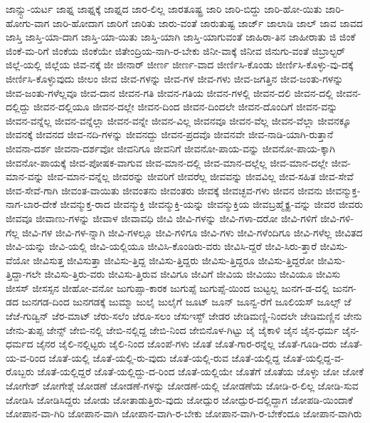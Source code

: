 {ಜಾನ್ಸ್ಟು-ಯರ್ಟ
ಜಾಫ್ನ
ಜಾಫ್ನಕ್ಕೆ
ಜಾಫ್ನದ
ಜಾರ-ಲಿಲ್ಲ
ಜಾರತೂಷ್ಟ್ರ
ಜಾರಿ
ಜಾರಿ-ಬಿದ್ದು
ಜಾರಿ-ಹೋ-ಯಿತು
ಜಾರಿ-ಹೋಗು-ವಾಗ
ಜಾರಿ-ಹೋದಾಗ
ಜಾರಿಗೆ
ಜಾರಿತು
ಜಾರು-ವಂತೆ
ಜಾರುತುಷ್ಟ
ಜಾರ್ಜ್
ಜಾಲಾಡಿ
ಜಾಲ್
ಜಾವ
ಜಾವದ
ಜಾಸ್ತಿ
ಜಾಸ್ತಿ-ಯಾ-ದಾಗ
ಜಾಸ್ತಿ-ಯಾ-ಯಿತು
ಜಾಸ್ತಿ-ಯಾಗಿ
ಜಾಸ್ತಿ-ಯಾಗುವಂತೆ
ಜಾಹಿರಾ-ತಿನ
ಜಾಹೀರಾತು
ಜಿ
ಜಿಂಕೆ
ಜಿಂಕೆ-ಮ-ರಿಗೆ
ಜಿಂಕೆಯ
ಜಿಂಕೆಯೇ
ಜಿತೇಂದ್ರಿಯ-ನಾಗಿ-ರ-ಬೇಕು
ಜಿನೀ-ವಾಕ್ಕೆ
ಜಿನೀವ
ಜಿನುಗು-ವಂತೆ
ಜಿಬ್ರಾಲ್ಟರ್
ಜಿಲ್ಲೆ-ಯಲ್ಲಿ
ಜಿಲ್ಲೆಯ
ಜಿವ-ನಕ್ಕೆ
ಜೀ
ಜೀನಾರ್
ಜೀರ್ಣ
ಜೀರ್ಣ-ವಾದ
ಜೀರ್ಣಿಸಿ-ಕೊಂಡು
ಜೀರ್ಣಿಸಿ-ಕೊಳ್ಳು-ವು-ದಕ್ಕೆ
ಜೀರ್ಣಿಸಿ-ಕೊಳ್ಳುವುದು
ಜೀಲಂ
ಜೀವ
ಜೀವ-ಗಳನ್ನು
ಜೀವ-ಗಳ
ಜೀವ-ಗಳು
ಜೀವ-ಜಗತ್ತಿನ
ಜೀವ-ಜಂತು-ಗಳನ್ನು
ಜೀವ-ಜಂತು-ಗಳೆಲ್ಲವೂ
ಜೀವ-ದಾನ
ಜೀವನ-ಗತಿ
ಜೀವನ-ಗತಿಯ
ಜೀವನ-ಗಳಲ್ಲಿ
ಜೀವನ-ದಲಿ
ಜೀವನ-ದಲ್ಲಿ
ಜೀವನ-ದಲ್ಲಿದ್ದು
ಜೀವನ-ದಲ್ಲಿಯೂ
ಜೀವನ-ದಲ್ಲೇ
ಜೀವನ-ದಿಂದ
ಜೀವನ-ದಿಂದಲೇ
ಜೀವನ-ದೊಂದಿಗೆ
ಜೀವನ-ವನ್ನು
ಜೀವನ-ವನ್ನೆಲ್ಲ
ಜೀವನ-ವನ್ನೆಲ್ಲಾ
ಜೀವನ-ವನ್ನೇ
ಜೀವನ-ವಿಲ್ಲ
ಜೀವನವೂ
ಜೀವನ-ವೆಲ್ಲ
ಜೀವನ-ವೆಲ್ಲಾ
ಜೀವನಕ್ಕೂ
ಜೀವನಕ್ಕೆ
ಜೀವನದ
ಜೀವ-ನದಿ-ಗಳನ್ನು
ಜೀವನದ್ದು
ಜೀವನ-ಪ್ರದವೊ
ಜೀವನವೇ
ಜೀವ-ನಾಡಿ-ಯಾಗಿ-ರುತ್ತಾನೆ
ಜೀವನಾ-ದರ್ಶ
ಜೀವನಾ-ದರ್ಶವೋ
ಜೀವನಿಗೂ
ಜೀವನಿಗೆ
ಜೀವನೋ-ಪಾಯ-ವನ್ನು
ಜೀವನೋ-ಪಾಯ-ಕ್ಕಾಗಿ
ಜೀವನೋ-ಪಾಯಕ್ಕೆ
ಜೀವ-ಪೋಷಕ-ವಾಗುವ
ಜೀವ-ಮಾನ-ದಲ್ಲಿ
ಜೀವ-ಮಾನ-ದಲ್ಲೆಲ್ಲ
ಜೀವ-ಮಾನ-ದಲ್ಲೇ
ಜೀವ-ಮಾನ-ವನ್ನು
ಜೀವ-ಮಾನ-ವನ್ನೆಲ್ಲ
ಜೀವರನ್ನು
ಜೀವರಿಗೆ
ಜೀವರೆಲ್ಲ
ಜೀವವನ್ನು
ಜೀವವಿಲ್ಲ
ಜೀವ-ಸಹಿತ
ಜೀವ-ಸೇವೆ
ಜೀವ-ಸೇವೆ-ಗಾಗಿ
ಜೀವಂತ-ವಾಯಿತು
ಜೀವಂತನು
ಜೀವಂತರು
ಜೀವಕ್ಕೆ
ಜೀವಚ್ಛವ-ಗಳು
ಜೀವನ
ಜೀವನು
ಜೀವನ್ಮುಕ್ತ-ನಾಗ-ಬಾರ-ದೇಕೆ
ಜೀವನ್ಮುಕ್ತ-ರಾದ
ಜೀವನ್ಮುಕ್ತಿ
ಜೀವನ್ಮುಕ್ತಿ-ಯನ್ನು
ಜೀವನ್ಮುಕ್ತಿಯ
ಜೀವಬ್ರಹ್ಮೈಕ್ಯ-ವನ್ನು
ಜೀವರ
ಜೀವರು
ಜೀವವೂ
ಜೀವಾಣು-ಗಳನ್ನು
ಜೀವಾಳ
ಜೀವಾವಧಿ
ಜೀವಿ
ಜೀವಿ-ಗಳನ್ನು
ಜೀವಿ-ಗಳಾ-ದರೋ
ಜೀವಿ-ಗಳಿಗೆ
ಜೀವಿ-ಗಳಿ-ಗೆಲ್ಲ
ಜೀವಿ-ಗಳ
ಜೀವಿ-ಗಳ-ನ್ನಾಗಿ
ಜೀವಿ-ಗಳಲ್ಲೂ
ಜೀವಿ-ಗಳಿಗೂ
ಜೀವಿ-ಗಳು
ಜೀವಿ-ಗಳೆಂದಿಗೂ
ಜೀವಿ-ಗಳೆಲ್ಲ
ಜೀವಿತದ
ಜೀವಿ-ಯನ್ನು
ಜೀವಿ-ಯಲ್ಲಿ
ಜೀವಿ-ಯಲ್ಲಿಯೂ
ಜೀವಿಸಿ-ಕೊಂಡಿರು-ವರು
ಜೀವಿಸಿ-ದ್ದರೆ
ಜೀವಿ-ಸಿರು-ತ್ತಾರೆ
ಜೀವಿಸು-ವೆಯೋ
ಜೀವಿಸುತ್ತ
ಜೀವಿಸುತ್ತಾ
ಜೀವಿಸು-ತ್ತಿದ್ದ
ಜೀವಿಸು-ತ್ತಿದ್ದರು
ಜೀವಿಸು-ತ್ತಿದ್ದರೂ
ಜೀವಿಸು-ತ್ತಿದ್ದರೋ
ಜೀವಿಸು-ತ್ತಿದ್ದಾ-ಗಲೇ
ಜೀವಿಸು-ತ್ತಿರು-ವರು
ಜೀವಿಸು-ತ್ತಿರುವ
ಜೀವಿಗೂ
ಜೀವಿಗೆ
ಜೀವಿಯ
ಜೀವಿಯು
ಜೀವಿಯೂ
ಜೀವಿಸು
ಜೀಸಸ್
ಜೀಸಸ್ಸನ
ಜೀಹೋ-ವನೋ
ಜುಗುಪ್ಸಾ-ಕಾರಕ
ಜುಗುಪ್ಸೆ
ಜುಗುಪ್ಸೆ-ಯಿಂದ
ಜುಟ್ಟಲ್ಲ
ಜುನಗ-ಡ-ದಲ್ಲಿ
ಜುನಗ-ಡದ
ಜುನಗಡ-ದಿಂದ
ಜುನಗಡಕ್ಕೆ
ಜುಮ್ಮಾ
ಜುಲೈ
ಜುಲೈಗೆ
ಜೂಟ್
ಜೂನ್
ಜೂನ್ವ-ರೆಗೆ
ಜೂಲಿಯಸ್
ಜೂಲ್ಸ್
ಜೆ
ಜೆಜೆ-ಗುಡ್ವಿನ್
ಜೆರ-ಮಾಟ್
ಜೆರು-ಸಲೆಂ
ಜೆರೂ-ಸಲಂ
ಜೆಸುಇಸ್ಟ್
ಜೇಡರ
ಜೇಡಿಮಣ್ಣಿ-ನಿಂದಲೇ
ಜೇಡಿಮಣ್ಣಿನ
ಜೇನು
ಜೇನು-ತುಪ್ಪ
ಜೇನ್ಸ್
ಜೇಬಿ-ನಲ್ಲಿ
ಜೇಬಿ-ನಲ್ಲಿದ್ದ
ಜೇಬಿ-ನಿಂದ
ಜೇಬಿನೊಳ-ಗಿಟ್ಟು
ಜೈ
ಜೈಕಾಳಿ
ಜೈನ
ಜೈನ-ಧರ್ಮ
ಜೈನ-ಧರ್ಮದ
ಜೈನರ
ಜೈಲಿ-ನಲ್ಲಿಟ್ಟರು
ಜೈಲಿ-ನಿಂದ
ಜೊಂಪೆ-ಗಳು
ಜೊತೆ
ಜೊತೆ-ಗಾರ-ರನ್ನೆಲ್ಲ
ಜೊತೆ-ಗೂಡಿ-ದರು
ಜೊತೆ-ಯ-ವ-ರಿಂದ
ಜೊತೆ-ಯಲ್ಲಿ
ಜೊತೆ-ಯಲ್ಲಿ-ರು-ವುದು
ಜೊತೆ-ಯಲ್ಲಿ-ರುವ
ಜೊತೆ-ಯಲ್ಲಿದ್ದ
ಜೊತೆ-ಯಲ್ಲಿದ್ದ-ವ-ರೊಬ್ಬರು
ಜೊತೆ-ಯಲ್ಲಿದ್ದರೆ
ಜೊತೆ-ಯಲ್ಲಿದ್ದು-ದ-ರಿಂದ
ಜೊತೆ-ಯಲ್ಲಿಯೇ
ಜೊತೆಗೆ
ಜೊತೆಯ
ಜೊಳ್ಳು
ಜೋ
ಜೋಕೆ
ಜೋಗೇಶ್
ಜೋಗೇಶ್ಗೆ
ಜೋಡಣೆ
ಜೋಡಣೆ-ಗಳನ್ನು
ಜೋಡಣೆ-ಯಲ್ಲಿ
ಜೋಡಣೆಯ
ಜೋಡಿ-ರ-ಲಿಲ್ಲ
ಜೋಡಿ-ಸುವ
ಜೋಡಿಸಿ
ಜೋಡಿಸಿದ್ದರು
ಜೋಡು
ಜೋತಾಡುತ್ತಿರು-ವುದು
ಜೋದ್ಪುರ
ಜೋದ್ಪುರ-ದಲ್ಲಿದ್ದಾಗ
ಜೋಪಡಿ-ಯಿಂದಾಕೆ
ಜೋಪಾನ-ವಾ-ಗಿರಿ
ಜೋಪಾನ-ವಾಗಿ
ಜೋಪಾನ-ವಾಗಿ-ರ-ಬೇಕು
ಜೋಪಾನ-ವಾಗಿ-ರ-ಬೇಕೆಂದೂ
ಜೋಪಾನ-ವಾಗಿರು
}
